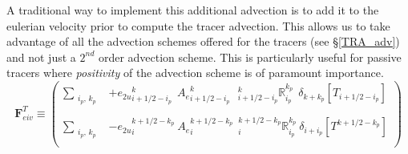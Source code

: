 A traditional way to implement this additional advection is to add it to the eulerian 
velocity prior to compute the tracer advection. This allows us to take advantage of 
all the advection schemes offered for the tracers (see \S\ref{TRA_adv}) and not just 
a $2^{nd}$ order advection scheme. This is particularly useful for passive tracers 
where \emph{positivity} of the advection scheme is of paramount importance. 
\begin{equation} \label{Eq_eiv_vd}  
\textbf{F}_{eiv}^T   \equiv   \left( \begin{aligned}                                
 \sum_{\substack{i_p,\,k_p}} &
 +{e_{2u}}_{i+1/2-i_p}^{k}                                  \ \ {A_{e}}_{i+1/2-i_p}^{k} 
\ \ \ { _{i+1/2-i_p}^k \mathbb{R}_{i_p}^{k_p} }    \ \ \delta_{k+k_p}[T_{i+1/2-i_p}]      \\
    \\
 \sum_{\substack{i_p,\,k_p}} &
 - {e_{2u}}_i^{k+1/2-k_p}                                      \ {A_{e}}_i^{k+1/2-k_p} 
\ \ { _i^{k+1/2-k_p} \mathbb{R}_{i_p}^{k_p} }    \ \delta_{i+i_p}[T^{k+1/2-k_p}]    \\   
\end{aligned}   \right)
\end{equation}

